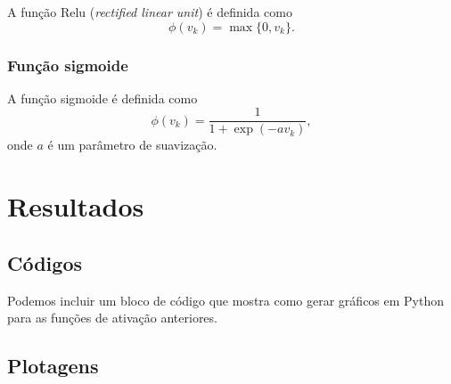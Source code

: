 \documentclass[10pt,journal,compsoc]{IEEEtran}
\begin{document}
A função Relu (\textit{rectified linear unit}) é definida como  
\begin{equation*} %
\phi(v_k) = \max\{ 0, v_k \}.
\end{equation*}

\subsubsection{Função sigmoide}

A função sigmoide é definida como  
\begin{equation*} %
\phi(v_k) = \frac{1}{1 + \exp(-a v_k)},
\end{equation*}
onde $a$ é um parâmetro de suavização.


\section{Resultados}
\label{sec:resultados}

\subsection{Códigos}
\label{subsec:codigos}

Podemos incluir um bloco de código que mostra como gerar 
gráficos em Python para as funções de ativação anteriores.



\subsection{Plotagens}
\end{document}
